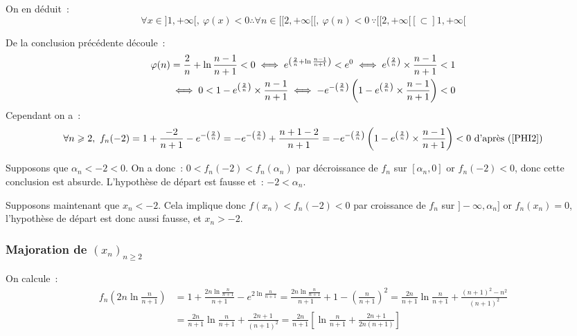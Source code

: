 \documentclass{article}
\begin{document}
  On en déduit~:
  \begin{equation}\label{PHI}
    \forall x\in]1,+\infty[,\ \varphi(x)<0\therefore\forall n\in[\![2,+\infty[\![,\ \varphi(n)<0\ \because[\![2,+\infty[\![\subset]1,+\infty[
  \end{equation}

  De la conclusion précédente découle~:
  \begin{align}
    \varphi(n)=\frac{2}{n}+\ln\frac{n-1}{n+1}<0\iff e^{\left(\frac{2}{n}+\ln\frac{n-1}{n+1}\right)}<e^0\iff e^{\left(\frac{2}{n}\right)}\times\frac{n-1}{n+1}<1 \notag\\
    \iff 0<1-e^{\left(\frac{2}{n}\right)}\times\frac{n-1}{n+1} \iff-e^{-\left(\frac{2}{n}\right)}\left(1-e^{\left(\frac{2}{n}\right)}\times\frac{n-1}{n+1}\right)<0 \label{PHI2}
  \end{align}
  Cependant on a~:
  \begin{displaymath}
      \forall n\geqslant2,\ f_n(-2)=1+\frac{-2}{n+1}-e^{-\left(\frac{2}{n}\right)}=-e^{-\left(\frac{2}{n}\right)}+\frac{n+1-2}{n+1}=-e^{-\left(\frac{2}{n}\right)}\left(1-e^{\left(\frac{2}{n}\right)}\times\frac{n-1}{n+1}\right)<0\text{ d'après (\ref{PHI2})}
  \end{displaymath}

  Supposons que $\alpha_n<-2<0$. On a donc~: $0<f_n(-2)<f_n(\alpha_n)$ par décroissance de $f_n$ sur $[\alpha_n, 0]$ or $f_n(-2)<0$, donc cette conclusion est absurde. L'hypothèse de départ est fausse et~: $-2<\alpha_n$.

  Supposons maintenant que $x_n<-2$. Cela implique donc $f(x_n)<f_n(-2)<0$ par croissance de $f_n$ sur $]-\infty,\alpha_n]$ or $f_n(x_n)=0$, l'hypothèse de départ est donc aussi fausse, et $x_n>-2$.

  \subsubsection{Majoration de $(x_n)_{n\geqslant 2}$}
  On calcule~:
  \begin{align*}
    f_n\left(2n\ln\frac{n}{n+1}\right)&=1+\frac{2n\ln\frac{n}{n+1}}{n+1}-e^{2\ln\frac{n}{n+1}}=\frac{2n\ln\frac{n}{n+1}}{n+1}+1-\left(\frac{n}{n+1}\right)^2=\frac{2n}{n+1}\ln\frac{n}{n+1}+\frac{(n+1)^2-n^2}{(n+1)^2} \\
    &=\frac{2n}{n+1}\ln\frac{n}{n+1}+\frac{2n+1}{(n+1)^2}=\frac{2n}{n+1}\left[\ln\frac{n}{n+1}+\frac{2n+1}{2n(n+1)}\right]
  \end{align*}
\end{document}
